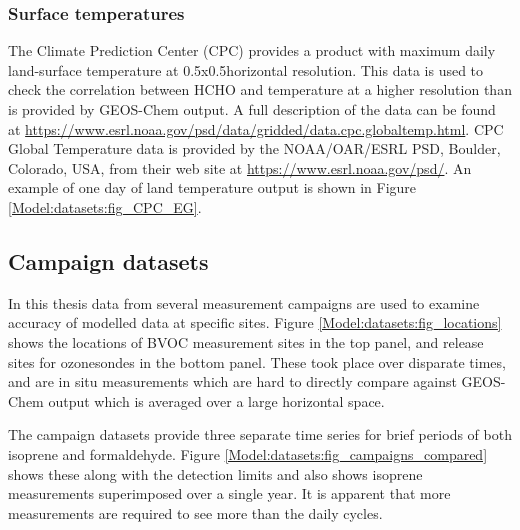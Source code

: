     \subsubsection{Surface temperatures}
      The Climate Prediction Center (CPC) provides a product with maximum daily land-surface temperature at 0.5x0.5\degr  horizontal resolution. 
      This data is used to check the correlation between HCHO and temperature at a higher resolution than is provided by GEOS-Chem output.
      A full description of the data can be found at \url{https://www.esrl.noaa.gov/psd/data/gridded/data.cpc.globaltemp.html}.
      CPC Global Temperature data is provided by the NOAA/OAR/ESRL PSD, Boulder, Colorado, USA, from their web site at \url{https://www.esrl.noaa.gov/psd/}.
      An example of one day of land temperature output is shown in Figure \ref{Model:datasets:fig_CPC_EG}.
      
  
  \subsection{Campaign datasets}
  
    In this thesis data from several measurement campaigns are used to examine accuracy of modelled data at specific sites.
    Figure \ref{Model:datasets:fig_locations} shows the locations of BVOC measurement sites in the top panel, and release sites for ozonesondes in the bottom panel.
    These took place over disparate times, and are in situ measurements which are hard to directly compare against GEOS-Chem output which is averaged over a large horizontal space.
    
    
    The campaign datasets provide three separate time series for brief periods of both isoprene and formaldehyde.
    Figure \ref{Model:datasets:fig_campaigns_compared} shows these along with the detection limits and also shows isoprene measurements superimposed over a single year.
    It is apparent that more measurements are required to see more than the daily cycles.
    
    
    

